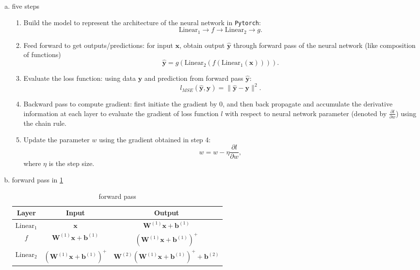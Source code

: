 \documentclass[10pt,a4paper]{article}
\theoremstyle{dotlessP}
\newcommand{\linear}{\text{Linear}}
\newcommand{\yh}{\bm{\hat{y}}}
\begin{document}
\begin{enumerate}[(a)]
	\item  five steps
	\begin{enumerate}[1)]
		\item Build the model to represent the architecture of the neural network in \texttt{Pytorch}:
		\begin{equation}
		\linear_1\rightarrow f \rightarrow \linear_2\rightarrow g.
		\end{equation}
		\item Feed forward to get outputs/predictions: for input $\bm x$, obtain output $\yh$ through forward pass of the neural network (like composition of functions)
		\begin{equation}
		\yh = g(\linear_2(f(\linear_1(\bm x) )  )).
		\end{equation}
		\item Evaluate the loss function: using data $\bm y$ and prediction from forward pass $\yh$:
		\begin{equation}
		l_{MSE}(\yh, \bm y)=\|\yh -\bm y\|^2.
		\end{equation}
		\item Backward pass to compute gradient: first initiate the gradient by 0, and then back propagate and accumulate the derivative information at each layer to evaluate the gradient of loss function $l$ with respect to neural network parameter (denoted by $\frac{\partial l}{\partial w}$) using the chain rule.
		\item Update the parameter $w$ using the gradient obtained in step 4:
		\begin{equation}
		w = w - \eta\frac{\partial l}{\partial w},
		\end{equation}
		where $\eta$ is the step size.
	\end{enumerate}
	\item forward pass in \cref{tab:fw}
	\begin{table}[tbhp] 
		{\footnotesize
			\caption{ forward pass
			}\label{tab:fw}
			\begin{center}
				\renewcommand{\arraystretch}{1.5}
			\begin{tabular}{|c|c|c|}
				\hline 
				 Layer & Input  & Output \\ 
				\hline 
				$\linear_1$& $\bm x$ & $\bm W^{(1)} \bm x+\bm b^{(1)}$ \\ 
				\hline 
			$f$	&$\bm W^{(1)} \bm x+\bm b^{(1)}$&  $\left(\bm W^{(1)} \bm x+\bm b^{(1)}\right)^+$\\ 
				\hline 
				$\linear_2$& $\left(\bm W^{(1)} \bm x+\bm b^{(1)}\right)^+$ & $\bm W^{(2)}\left(\bm W^{(1)} \bm x+\bm b^{(1)}\right)^+ + \bm b^{(2)}$ \\ 

\end{tabular}
\end{center}}
\end{table}
\end{enumerate}
\end{document}
